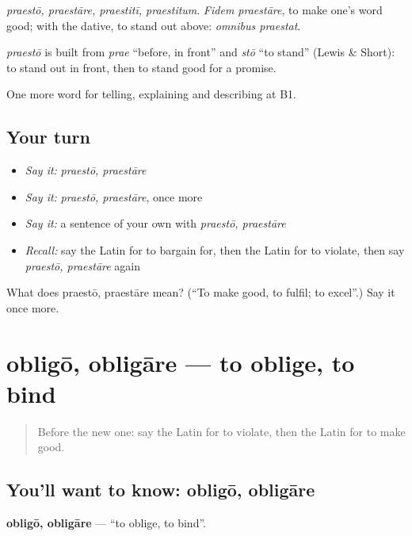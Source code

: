 \emph{praestō, praestāre, praestitī, praestitum}. \emph{Fidem praestāre}, to make one's word good; with the dative, to stand out above: \emph{omnibus praestat}.

\begin{cousinweb}
\emph{praestō} is built from \emph{prae} \textquotedblleft{}before, in front\textquotedblright{} and \emph{stō} \textquotedblleft{}to stand\textquotedblright{} (Lewis \& Short): to stand out in front, then to stand good for a promise.
\end{cousinweb}

\begin{grammarlens}[title={What you've built}]
One more word for telling, explaining and describing at B1.
\end{grammarlens}

\subsection*{Your turn}
\begin{itemize}
\raggedright
  \item \emph{Say it:} \emph{praestō, praestāre}
  \item \emph{Say it:} \emph{praestō, praestāre}, once more
  \item \emph{Say it:} a sentence of your own with \emph{praestō, praestāre}
  \item \emph{Recall:} say the Latin for to bargain for, then the Latin for to violate, then say \emph{praestō, praestāre} again
\end{itemize}

\begin{tcolorbox}[breakable,colback=teal!4,colframe=teal!35!black,title={Before you move on}]
What does praestō, praestāre mean? (\textquotedblleft{}To make good, to fulfil; to excel\textquotedblright{}.) Say it once more.
\end{tcolorbox}
\section[obligō, obligāre]{obligō, obligāre — to oblige, to bind}

\label{lesson:LA-C398-obligo}



\begin{quote}
Before the new one: say the Latin for to violate, then the Latin for to make good.
\end{quote}

\subsection*{You'll want to know: obligō, obligāre}
\textbf{obligō, obligāre} — \textquotedblleft{}to oblige, to bind\textquotedblright{}.


